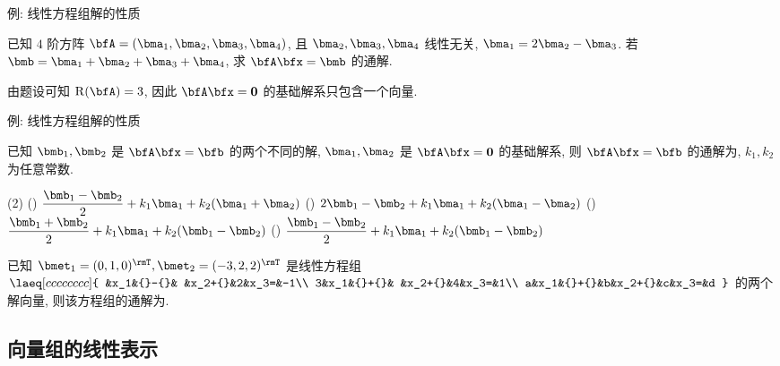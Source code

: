 \begin{frame}{例: 线性方程组解的性质}
	\onslide<+->
	\begin{example}
		已知 $4$ 阶方阵 $\bfA=(\bma_1,\bma_2,\bma_3,\bma_4)$, 且 $\bma_2,\bma_3,\bma_4$ 线性无关, $\bma_1=2\bma_2-\bma_3$.
		若 $\bmb=\bma_1+\bma_2+\bma_3+\bma_4$, 求 $\bfA\bfx=\bmb$ 的通解.
	\end{example}
	\onslide<+->
	\begin{solution}
		由题设可知 $\rank(\bfA)=3$, 因此 $\bfA\bfx={\bf0}$ 的基础解系只包含一个向量.
		\vspace{-\baselineskip}
	\end{solution}
\end{frame}


\begin{frame}{例: 线性方程组解的性质}
	\onslide<+->
	\begin{example}
		已知 $\bmb_1,\bmb_2$ 是 $\bfA\bfx=\bfb$ 的两个不同的解, $\bma_1,\bma_2$ 是 $\bfA\bfx={\bf0}$ 的基础解系, 则 $\bfA\bfx=\bfb$ 的通解为, $k_1,k_2$ 为任意常数.
		\begin{exchoice}(2)
			() $\dfrac{\bmb_1-\bmb_2}2+k_1\bma_1+k_2(\bma_1+\bma_2)$
			() $2\bmb_1-\bmb_2+k_1\bma_1+k_2(\bma_1-\bma_2)$
			() $\dfrac{\bmb_1+\bmb_2}2+k_1\bma_1+k_2(\bmb_1-\bmb_2)$
			() $\dfrac{\bmb_1-\bmb_2}2+k_1\bma_1+k_2(\bmb_1-\bmb_2)$
		\end{exchoice}
	\end{example}
	\onslide<+->
	\begin{exercise}
		已知 $\bmet_1=(0,1,0)^\rmT,\bmet_2=(-3,2,2)^\rmT$ 是线性方程组 $\laeq[cccccccc]{
			 &x_1&{}-{}& &x_2+{}&2&x_3=&-1\\
			3&x_1&{}+{}& &x_2+{}&4&x_3=&1\\
			a&x_1&{}+{}&b&x_2+{}&c&x_3=&d
		}$ 的两个解向量, 则该方程组的通解为.
	\end{exercise}
\end{frame}


\subsection{向量组的线性表示}


